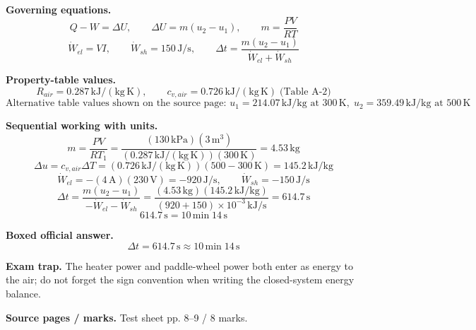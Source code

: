 \textbf{Governing equations.}
\[
Q-W=\Delta U,\qquad \Delta U=m(u_2-u_1),\qquad m=\frac{PV}{RT}
\]
\[
\dot W_{el}=VI,\qquad \dot W_{sh}=150\,\mathrm{J/s},\qquad \Delta t=\frac{m(u_2-u_1)}{\dot W_{el}+\dot W_{sh}}
\]

\textbf{Property-table values.}
\[
R_{air}=0.287\,\mathrm{kJ/(kg\,K)},\qquad c_{v,air}=0.726\,\mathrm{kJ/(kg\,K)}\;\text{(Table A-2)}
\]
\[
\text{Alternative table values shown on the source page: } u_1=214.07\,\mathrm{kJ/kg}\text{ at }300\,\mathrm{K},\; u_2=359.49\,\mathrm{kJ/kg}\text{ at }500\,\mathrm{K}
\]

\textbf{Sequential working with units.}
\[
m=\frac{PV}{RT_1}=\frac{(130\,\mathrm{kPa})(3\,\mathrm{m^3})}{(0.287\,\mathrm{kJ/(kg\,K)})(300\,\mathrm{K})}=4.53\,\mathrm{kg}
\]
\[
\Delta u=c_{v,air}\Delta T=(0.726\,\mathrm{kJ/(kg\,K)})(500-300\,\mathrm{K})=145.2\,\mathrm{kJ/kg}
\]
\[
\dot W_{el}=-(4\,\mathrm{A})(230\,\mathrm{V})=-920\,\mathrm{J/s},\qquad \dot W_{sh}=-150\,\mathrm{J/s}
\]
\[
\Delta t=\frac{m(u_2-u_1)}{-\dot W_{el}-\dot W_{sh}}=\frac{(4.53\,\mathrm{kg})(145.2\,\mathrm{kJ/kg})}{(920+150)\times 10^{-3}\,\mathrm{kJ/s}}=614.7\,\mathrm{s}
\]
\[
614.7\,\mathrm{s}=10\,\mathrm{min}\;14\,\mathrm{s}
\]

\textbf{Boxed official answer.}
\[
\boxed{\Delta t=614.7\,\mathrm{s}\approx 10\,\mathrm{min}\;14\,\mathrm{s}}
\]

\textbf{Exam trap.} The heater power and paddle-wheel power both enter as energy to the air; do not forget the sign convention when writing the closed-system energy balance.

\textbf{Source pages / marks.} Test sheet pp. 8--9 / 8 marks.


